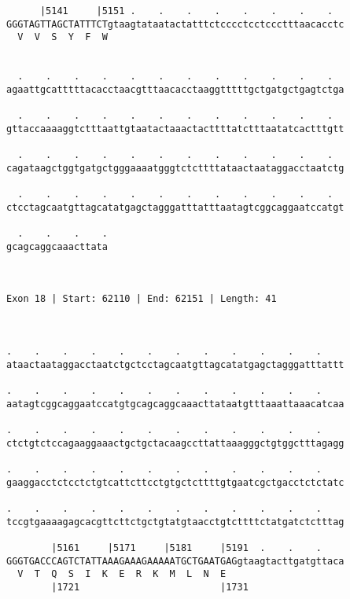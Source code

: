 \documentclass{article}
\begin{document}
\begin{Verbatim}
      |5141     |5151 .    .    .    .    .    .    .    .  
GGGTAGTTAGCTATTTCTgtaagtataatactatttctcccctcctccctttaacacctc
  V  V  S  Y  F  W                                          
                                                            
  
  .    .    .    .    .    .    .    .    .    .    .    .  
agaattgcatttttacacctaacgtttaacacctaaggtttttgctgatgctgagtctga
                                                            
  .    .    .    .    .    .    .    .    .    .    .    .  
gttaccaaaaggtctttaattgtaatactaaactacttttatctttaatatcactttgtt
                                                            
  .    .    .    .    .    .    .    .    .    .    .    .  
cagataagctggtgatgctgggaaaatgggtctcttttataactaataggacctaatctg
                                                            
  .    .    .    .    .    .    .    .    .    .    .    .  
ctcctagcaatgttagcatatgagctagggatttatttaatagtcggcaggaatccatgt
                                                            
  .    .    .    .
gcagcaggcaaacttata
                  
                  
 
Exon 18 | Start: 62110 | End: 62151 | Length: 41



.    .    .    .    .    .    .    .    .    .    .    .    
ataactaataggacctaatctgctcctagcaatgttagcatatgagctagggatttattt
                                                            
.    .    .    .    .    .    .    .    .    .    .    .    
aatagtcggcaggaatccatgtgcagcaggcaaacttataatgtttaaattaaacatcaa
                                                            
.    .    .    .    .    .    .    .    .    .    .    .    
ctctgtctccagaaggaaactgctgctacaagccttattaaagggctgtggctttagagg
                                                            
.    .    .    .    .    .    .    .    .    .    .    .    
gaaggacctctcctctgtcattcttcctgtgctcttttgtgaatcgctgacctctctatc
                                                            
.    .    .    .    .    .    .    .    .    .    .    .    
tccgtgaaaagagcacgttcttctgctgtatgtaacctgtcttttctatgatctctttag
                                                            
        |5161     |5171     |5181     |5191  .    .    .    
GGGTGACCCAGTCTATTAAAGAAAGAAAAATGCTGAATGAGgtaagtacttgatgttaca
  V  T  Q  S  I  K  E  R  K  M  L  N  E                     
        |1721                         |1731                 
  

\end{Verbatim}
\end{document}
